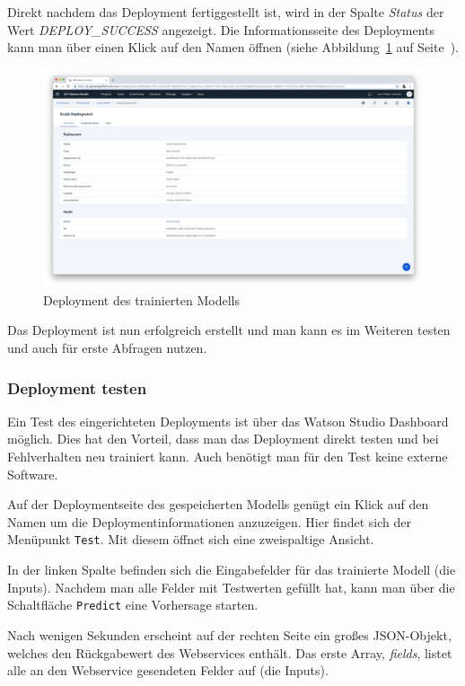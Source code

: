 Direkt nachdem das Deployment fertiggestellt ist, wird in der Spalte \textit{Status} der Wert \textit{DEPLOY\_SUCCESS}
angezeigt. Die Informationsseite des Deployments kann man über einen Klick auf den Namen öffnen
(siehe Abbildung~\ref{fig:umsetzung_deployment} auf Seite~\pageref{fig:umsetzung_deployment}).

\begin{figure}[h]
    \centering
    \includegraphics[width=\textwidth]{images/kapitel_3/umsetzung_deployment_model.png}
    \caption{Deployment des trainierten Modells}
    \label{fig:umsetzung_deployment}
\end{figure}

Das Deployment ist nun erfolgreich erstellt und man kann es im Weiteren testen und auch für erste Abfragen nutzen.

\subsubsection{Deployment testen}
Ein Test des eingerichteten Deployments ist über das Watson Studio Dashboard möglich. Dies hat den Vorteil, dass man das
Deployment direkt testen und bei Fehlverhalten neu trainiert kann. Auch benötigt man für den Test keine externe Software.

Auf der Deploymentseite des gespeicherten Modells genügt ein Klick auf den Namen um die Deploymentinformationen
anzuzeigen. Hier findet sich der Menüpunkt \texttt{Test}. Mit diesem öffnet sich eine zweispaltige Ansicht.

In der linken Spalte befinden sich die Eingabefelder für das trainierte Modell (die Inputs). Nachdem man alle Felder mit
Testwerten gefüllt hat, kann man über die Schaltfläche \texttt{Predict} eine Vorhersage starten.

Nach wenigen Sekunden erscheint auf der rechten Seite ein großes JSON-Objekt, welches den Rückgabewert des Webservices
enthält. Das erste Array, \textit{fields}, listet alle an den Webservice gesendeten Felder auf (die Inputs).


